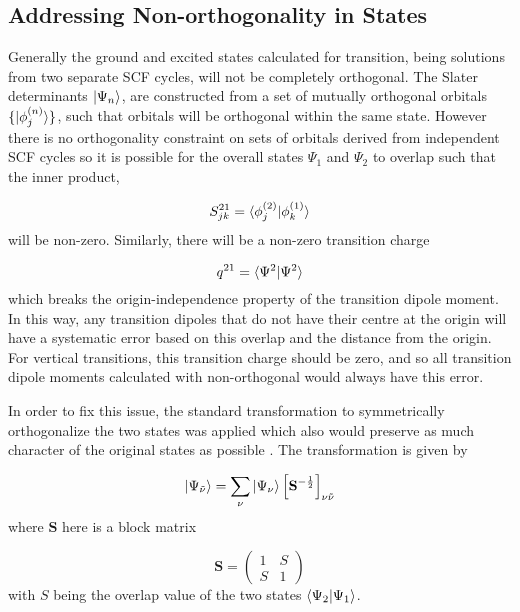 \subsection{Addressing Non-orthogonality in \dscf States}
\label{subsec:dscf_nonorth}
Generally the ground and excited states calculated for \dscf transition, being solutions
from two separate SCF cycles, will not be completely orthogonal. The Slater determinants
$\ket{\Psi_n}$, are constructed from a set of mutually orthogonal orbitals $\{ \ket{\phi_j^{\left(n\right)}} \}$,
such that orbitals will be orthogonal within the same state. However there is no 
orthogonality constraint on sets of orbitals derived from independent SCF cycles
so it is possible for the overall states $\Psi_1$ and $\Psi_2$ to overlap such 
that the inner product,

\begin{equation}
S^{21}_{jk} = \braket{\phi_j^{\left(2\right)} | \phi_k^{\left(1\right)}}
\end{equation}
%
will be non-zero. Similarly, there will be a non-zero transition charge

\begin{equation}
q^{21} = \braket{\Psi^2|\Psi^2}
\end{equation}
%
which breaks the origin-independence property of the transition dipole moment. In
this way, any transition dipoles that do not have their centre at the origin will
have a systematic error based on this overlap and the distance from the origin.
For vertical transitions, this transition charge should be zero, and so all transition
dipole moments calculated with non-orthogonal \dscf would always have this error.

In order to fix this issue, the standard transformation to symmetrically orthogonalize 
the two states was applied which also would preserve as much character of the original
states as possible \cite{Lowdin1950}. The transformation is given by

\begin{equation}
\ket{\Psi_{\tilde{\nu}}} = \sum_{\nu} \ket{\Psi_\nu} \left[\mathbf{S}^{-\frac{1}{2}} \right]_{\nu\tilde{\nu}}
\end{equation}
%
where $\mathbf{S}$ here is a block matrix

\begin{equation}
\mathbf{S} = \begin{pmatrix}
    1 & S \\
    S & 1 
\end{pmatrix}
\end{equation}
%
with $S$ being the overlap value of the two states $\braket{\Psi_2|\Psi_1}$.

